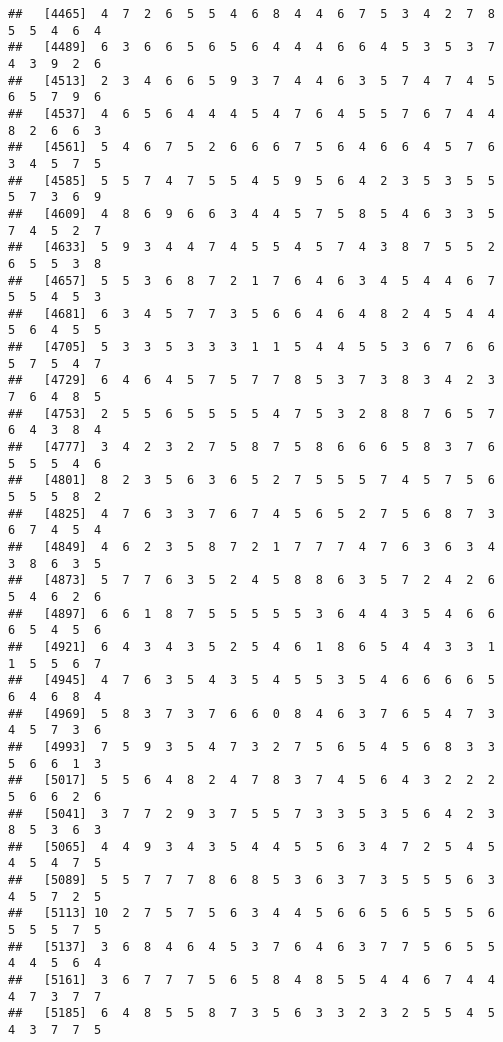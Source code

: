\documentclass[
]{book}
\begin{document}
\begin{verbatim}
##   [4465]  4  7  2  6  5  5  4  6  8  4  4  6  7  5  3  4  2  7  8  5  5  4  6  4
##   [4489]  6  3  6  6  5  6  5  6  4  4  4  6  6  4  5  3  5  3  7  4  3  9  2  6
##   [4513]  2  3  4  6  6  5  9  3  7  4  4  6  3  5  7  4  7  4  5  6  5  7  9  6
##   [4537]  4  6  5  6  4  4  4  5  4  7  6  4  5  5  7  6  7  4  4  8  2  6  6  3
##   [4561]  5  4  6  7  5  2  6  6  6  7  5  6  4  6  6  4  5  7  6  3  4  5  7  5
##   [4585]  5  5  7  4  7  5  5  4  5  9  5  6  4  2  3  5  3  5  5  5  7  3  6  9
##   [4609]  4  8  6  9  6  6  3  4  4  5  7  5  8  5  4  6  3  3  5  7  4  5  2  7
##   [4633]  5  9  3  4  4  7  4  5  5  4  5  7  4  3  8  7  5  5  2  6  5  5  3  8
##   [4657]  5  5  3  6  8  7  2  1  7  6  4  6  3  4  5  4  4  6  7  5  5  4  5  3
##   [4681]  6  3  4  5  7  7  3  5  6  6  4  6  4  8  2  4  5  4  4  5  6  4  5  5
##   [4705]  5  3  3  5  3  3  3  1  1  5  4  4  5  5  3  6  7  6  6  5  7  5  4  7
##   [4729]  6  4  6  4  5  7  5  7  7  8  5  3  7  3  8  3  4  2  3  7  6  4  8  5
##   [4753]  2  5  5  6  5  5  5  5  4  7  5  3  2  8  8  7  6  5  7  6  4  3  8  4
##   [4777]  3  4  2  3  2  7  5  8  7  5  8  6  6  6  5  8  3  7  6  5  5  5  4  6
##   [4801]  8  2  3  5  6  3  6  5  2  7  5  5  5  7  4  5  7  5  6  5  5  5  8  2
##   [4825]  4  7  6  3  3  7  6  7  4  5  6  5  2  7  5  6  8  7  3  6  7  4  5  4
##   [4849]  4  6  2  3  5  8  7  2  1  7  7  7  4  7  6  3  6  3  4  3  8  6  3  5
##   [4873]  5  7  7  6  3  5  2  4  5  8  8  6  3  5  7  2  4  2  6  5  4  6  2  6
##   [4897]  6  6  1  8  7  5  5  5  5  5  3  6  4  4  3  5  4  6  6  6  5  4  5  6
##   [4921]  6  4  3  4  3  5  2  5  4  6  1  8  6  5  4  4  3  3  1  1  5  5  6  7
##   [4945]  4  7  6  3  5  4  3  5  4  5  5  3  5  4  6  6  6  6  5  6  4  6  8  4
##   [4969]  5  8  3  7  3  7  6  6  0  8  4  6  3  7  6  5  4  7  3  4  5  7  3  6
##   [4993]  7  5  9  3  5  4  7  3  2  7  5  6  5  4  5  6  8  3  3  5  6  6  1  3
##   [5017]  5  5  6  4  8  2  4  7  8  3  7  4  5  6  4  3  2  2  2  5  6  6  2  6
##   [5041]  3  7  7  2  9  3  7  5  5  7  3  3  5  3  5  6  4  2  3  8  5  3  6  3
##   [5065]  4  4  9  3  4  3  5  4  4  5  5  6  3  4  7  2  5  4  5  4  5  4  7  5
##   [5089]  5  5  7  7  7  8  6  8  5  3  6  3  7  3  5  5  5  6  3  4  5  7  2  5
##   [5113] 10  2  7  5  7  5  6  3  4  4  5  6  6  5  6  5  5  5  6  5  5  5  7  5
##   [5137]  3  6  8  4  6  4  5  3  7  6  4  6  3  7  7  5  6  5  5  4  4  5  6  4
##   [5161]  3  6  7  7  7  5  6  5  8  4  8  5  5  4  4  6  7  4  4  4  7  3  7  7
##   [5185]  6  4  8  5  5  8  7  3  5  6  3  3  2  3  2  5  5  4  5  4  3  7  7  5

\end{verbatim}
\end{document}
